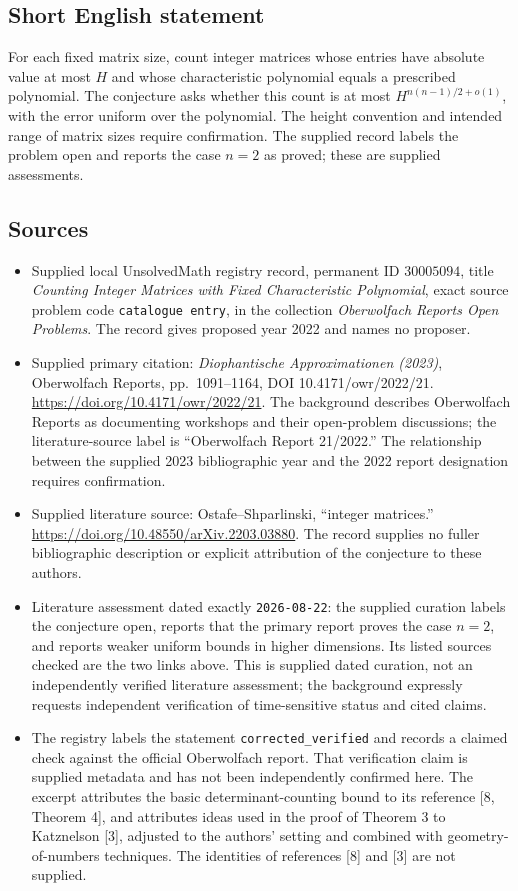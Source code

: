 \documentclass[11pt]{article}
\begin{document}
\subsection{Short English statement}
For each fixed matrix size, count integer matrices whose entries have absolute value at most \(H\) and whose characteristic polynomial equals a prescribed polynomial. The conjecture asks whether this count is at most \(H^{n(n-1)/2+o(1)}\), with the error uniform over the polynomial. The height convention and intended range of matrix sizes require confirmation. The supplied record labels the problem open and reports the case \(n=2\) as proved; these are supplied assessments.
\subsection{Sources}
\begin{itemize}
\item Supplied local UnsolvedMath registry record, permanent ID \(30005094\), title \emph{Counting Integer Matrices with Fixed Characteristic Polynomial}, exact source problem code \texttt{catalogue entry}, in the collection \emph{Oberwolfach Reports Open Problems}. The record gives proposed year 2022 and names no proposer.
\item Supplied primary citation: \emph{Diophantische Approximationen (2023)}, Oberwolfach Reports, pp.\ 1091--1164, DOI 10.4171/owr/2022/21. \url{https://doi.org/10.4171/owr/2022/21}. The background describes Oberwolfach Reports as documenting workshops and their open-problem discussions; the literature-source label is ``Oberwolfach Report 21/2022.'' The relationship between the supplied 2023 bibliographic year and the 2022 report designation requires confirmation.
\item Supplied literature source: Ostafe--Shparlinski, ``integer matrices.'' \url{https://doi.org/10.48550/arXiv.2203.03880}. The record supplies no fuller bibliographic description or explicit attribution of the conjecture to these authors.
\item Literature assessment dated exactly \texttt{2026-08-22}: the supplied curation labels the conjecture open, reports that the primary report proves the case \(n=2\), and reports weaker uniform bounds in higher dimensions. Its listed sources checked are the two links above. This is supplied dated curation, not an independently verified literature assessment; the background expressly requests independent verification of time-sensitive status and cited claims.
\item The registry labels the statement \texttt{corrected\_verified} and records a claimed check against the official Oberwolfach report. That verification claim is supplied metadata and has not been independently confirmed here. The excerpt attributes the basic determinant-counting bound to its reference [8, Theorem 4], and attributes ideas used in the proof of Theorem 3 to Katznelson [3], adjusted to the authors' setting and combined with geometry-of-numbers techniques. The identities of references [8] and [3] are not supplied.
\end{itemize}
\end{document}
